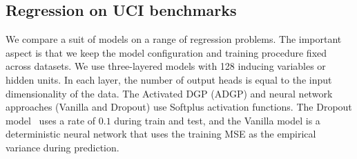 

\subsection{Regression on UCI benchmarks}
We compare a suit of models on a range of regression problems. The important aspect is that we keep the model configuration and training procedure fixed across datasets. We use three-layered models with 128 inducing variables or hidden units. In each layer, the number of output heads is equal to the input dimensionality of the data. The Activated DGP (ADGP) and neural network approaches (Vanilla and Dropout) use Softplus activation functions. The Dropout model~\citep{Gal2016dropout} uses a rate of $0.1$ during train and test, and the Vanilla model is a deterministic neural network that uses the training MSE as the empirical variance during prediction.

